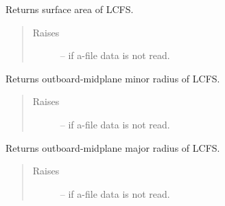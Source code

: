 \documentclass[letterpaper,10pt,english]{sphinxmanual}
\begin{document}
\begin{fulllineitems}
\begin{fulllineitems}
\begin{quote}
\begin{description}
\end{description}\end{quote}

\end{fulllineitems}


\begin{fulllineitems}
\label{eqtools:eqtools.eqdskreader.EqdskReader.getAreaLCFS}
Returns surface area of LCFS.
\begin{quote}\begin{description}
\item[{Raises}] \leavevmode
{} -- 
if a-file data is not read.

\end{description}\end{quote}

\end{fulllineitems}


\begin{fulllineitems}
\label{eqtools:eqtools.eqdskreader.EqdskReader.getAOut}
Returns outboard-midplane minor radius of LCFS.
\begin{quote}\begin{description}
\item[{Raises}] \leavevmode
{} -- 
if a-file data is not read.

\end{description}\end{quote}

\end{fulllineitems}


\begin{fulllineitems}
\label{eqtools:eqtools.eqdskreader.EqdskReader.getRmidOut}
Returns outboard-midplane major radius of LCFS.
\begin{quote}\begin{description}
\item[{Raises}] \leavevmode
{} -- 
if a-file data is not read.


\end{description}
\end{quote}
\end{fulllineitems}
\end{fulllineitems}
\end{document}
